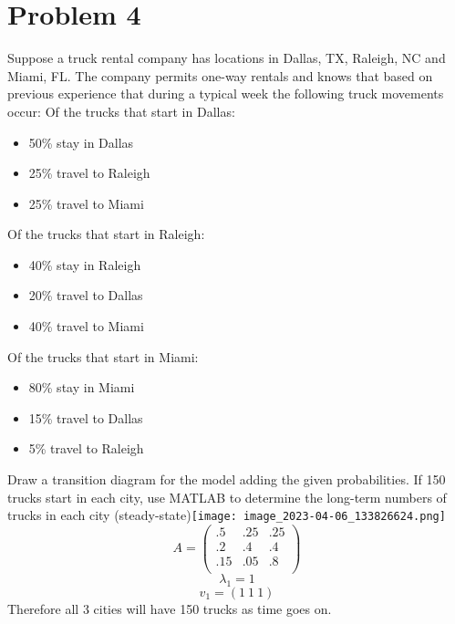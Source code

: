 \documentclass{article}
\begin{document}
\section*{Problem 4}
Suppose a truck rental company has locations in Dallas, TX, Raleigh, NC and Miami, FL. The company permits one-way rentals and knows that based on previous
experience that during a typical week the following truck movements occur:
Of the trucks that start in Dallas:\begin{itemize}
    \item 50\% stay in Dallas
\item 25\% travel to Raleigh
\item 25\% travel to Miami
\end{itemize}
Of the trucks that start in Raleigh:\begin{itemize}
\item 40\% stay in Raleigh
\item 20\% travel to Dallas
\item 40\% travel to Miami
\end{itemize}
Of the trucks that start in Miami:\begin{itemize}
\item 80\% stay in Miami
\item 15\% travel to Dallas
\item 5\% travel to Raleigh
\end{itemize}
Draw a transition diagram for the model adding the given probabilities. If 150
trucks start in each city, use MATLAB to determine the long-term numbers of trucks
in each city (steady-state)\newline\texttt{[image: image\_2023-04-06\_133826624.png]} $$A=\begin{pmatrix}.5 & .25 & .25\\ .2 & .4 & .4 \\ .15 & .05 & .8\\
\end{pmatrix}$$ $$\lambda_1=1$$ $$v_1=(1\ 1\ 1)$$ Therefore all 3 cities will have 150 trucks as time goes on.
\end{document}

